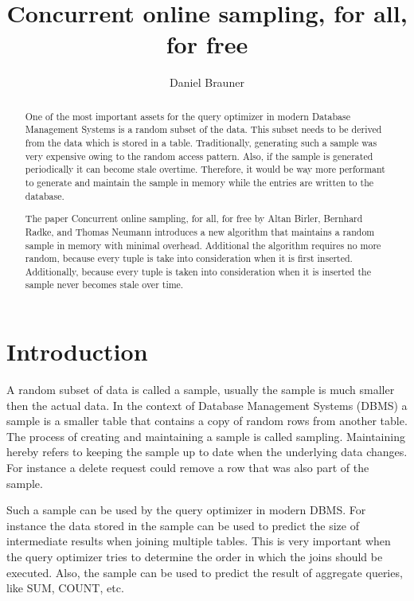 \documentclass[sigconf,nonacm]{acmart}
\begin{document}
    \title{Concurrent online sampling, for all, for free}

    \author{Daniel Brauner}
    
    \begin{abstract}
        One of the most important assets for the query optimizer in modern Database Management Systems is a random subset of the data. This subset needs to be derived from the data which is stored in a table. Traditionally, generating such a sample was very expensive owing to the random access pattern. Also, if the sample is generated periodically it can become stale overtime. Therefore, it would be way more performant to generate and maintain the sample in memory while the entries are written to the database.

        The paper Concurrent online sampling, for all, for free by Altan Birler, Bernhard Radke, and Thomas Neumann \cite{OG} introduces a new algorithm that maintains a random sample in memory with minimal overhead. Additional the algorithm requires no more random, because every tuple is take into consideration when it is first inserted. Additionally, because every tuple is taken into consideration when it is inserted the sample never becomes stale over time.
    \end{abstract}


    \maketitle

    \section{Introduction}
        A random subset of data is called a sample, usually the sample is much smaller then the actual data. In the context of Database Management Systems (DBMS) a sample is a smaller table that contains a copy of random rows from another table. The process of creating and maintaining a sample is called sampling. Maintaining hereby refers to keeping the sample up to date when the underlying data changes. For instance a delete request could remove a row that was also part of the sample.
    
        Such a sample can be used by the query optimizer in modern DBMS. For instance the data stored in the sample can be used to predict the size of intermediate results when joining multiple tables. This is very important when the query optimizer tries to determine the order in which the joins should be executed. Also, the sample can be used to predict the result of aggregate queries, like SUM, COUNT, etc. 
\end{document}
